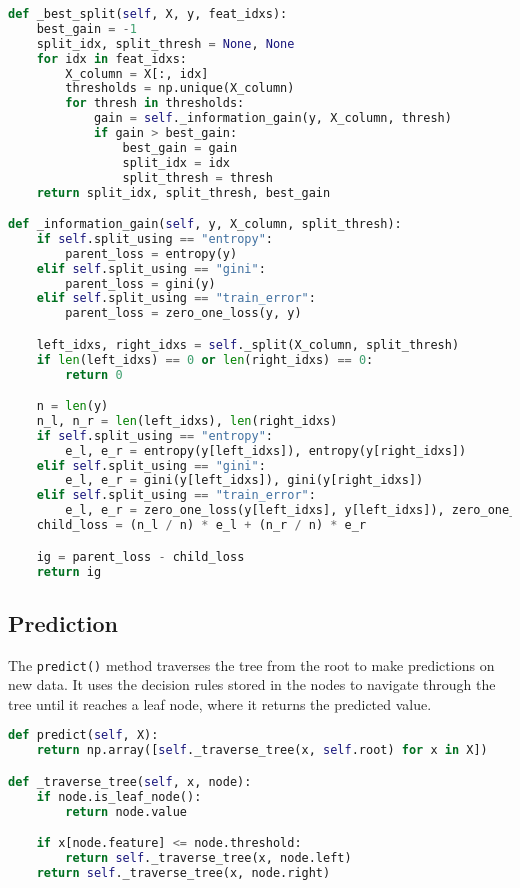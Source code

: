 \documentclass{article}
\begin{document}
\begin{lstlisting}[language=Python, caption=Splitting and Information Gain Calculation]
def _best_split(self, X, y, feat_idxs):
    best_gain = -1
    split_idx, split_thresh = None, None
    for idx in feat_idxs:
        X_column = X[:, idx]
        thresholds = np.unique(X_column)
        for thresh in thresholds:
            gain = self._information_gain(y, X_column, thresh)
            if gain > best_gain:
                best_gain = gain
                split_idx = idx
                split_thresh = thresh
    return split_idx, split_thresh, best_gain

def _information_gain(self, y, X_column, split_thresh):
    if self.split_using == "entropy":
        parent_loss = entropy(y)
    elif self.split_using == "gini":
        parent_loss = gini(y)
    elif self.split_using == "train_error":
        parent_loss = zero_one_loss(y, y)

    left_idxs, right_idxs = self._split(X_column, split_thresh)
    if len(left_idxs) == 0 or len(right_idxs) == 0:
        return 0

    n = len(y)
    n_l, n_r = len(left_idxs), len(right_idxs)
    if self.split_using == "entropy":
        e_l, e_r = entropy(y[left_idxs]), entropy(y[right_idxs])
    elif self.split_using == "gini":
        e_l, e_r = gini(y[left_idxs]), gini(y[right_idxs])
    elif self.split_using == "train_error":
        e_l, e_r = zero_one_loss(y[left_idxs], y[left_idxs]), zero_one_loss(y[right_idxs], y[right_idxs])
    child_loss = (n_l / n) * e_l + (n_r / n) * e_r

    ig = parent_loss - child_loss
    return ig
\end{lstlisting}

\subsection{Prediction}
The \texttt{predict()} method traverses the tree from the root to make predictions on new data. It uses the decision rules stored in the nodes to navigate through the tree until it reaches a leaf node, where it returns the predicted value.

\begin{lstlisting}[language=Python, caption=Prediction Method]
def predict(self, X):
    return np.array([self._traverse_tree(x, self.root) for x in X])

def _traverse_tree(self, x, node):
    if node.is_leaf_node():
        return node.value

    if x[node.feature] <= node.threshold:
        return self._traverse_tree(x, node.left)
    return self._traverse_tree(x, node.right)
\end{lstlisting}
\end{document}
